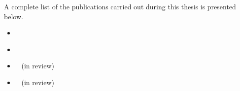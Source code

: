 A complete list of the publications carried out during this thesis is presented below.
\begin{itemize}
  \item\cite{fm16}~
  \item\cite{apsec17}~
  \item\cite{lites}~ (in review)
  \item\cite{sbip}~ (in review)
\end{itemize}


